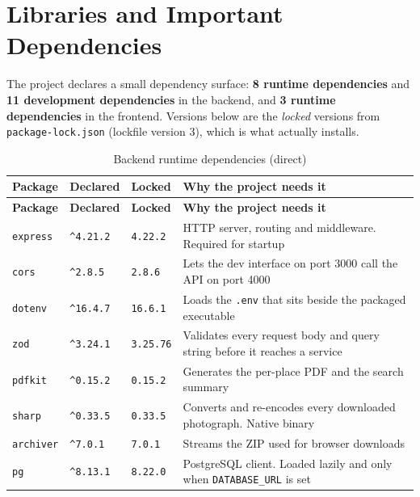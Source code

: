 \documentclass[11pt,a4paper]{report}
\newcommand{\code}[1]{\texttt{\small #1}}
\DeclareRobustCommand{\file}[1]{{\small\nolinkurl{#1}}}
\newcommand{\ver}[1]{\texttt{#1}}
\begin{document}
\chapter{Libraries and Important Dependencies}
\label{sec:libs}

The project declares a small dependency surface: \textbf{8 runtime dependencies}
and \textbf{11 development dependencies} in the backend, and \textbf{3 runtime
dependencies} in the frontend. Versions below are the \emph{locked} versions from
\file{package-lock.json} (lockfile version 3), which is what actually installs.

\begin{longtable}{@{}>{\raggedright\arraybackslash}p{2.9cm}>{\raggedright\arraybackslash}p{1.6cm}>{\raggedright\arraybackslash}p{2.0cm}>{\raggedright\arraybackslash}p{7.6cm}@{}}
\caption{Backend runtime dependencies (direct)}\label{tab:deps-backend}\\
\toprule
\textbf{Package} & \textbf{Declared} & \textbf{Locked} & \textbf{Why the project needs it}\\
\midrule
\endfirsthead
\toprule
\textbf{Package} & \textbf{Declared} & \textbf{Locked} & \textbf{Why the project needs it}\\
\midrule
\endhead
\bottomrule
\endfoot
\code{express}  & \code{\^{}4.21.2} & \ver{4.22.2} & HTTP server, routing and middleware. Required for startup\\
\code{cors}     & \code{\^{}2.8.5}  & \ver{2.8.6}  & Lets the dev interface on port 3000 call the API on port 4000\\
\code{dotenv}   & \code{\^{}16.4.7} & \ver{16.6.1} & Loads the \file{.env} that sits beside the packaged executable\\
\code{zod}      & \code{\^{}3.24.1} & \ver{3.25.76}& Validates every request body and query string before it reaches a service\\
\code{pdfkit}   & \code{\^{}0.15.2} & \ver{0.15.2} & Generates the per-place PDF and the search summary\\
\code{sharp}    & \code{\^{}0.33.5} & \ver{0.33.5} & Converts and re-encodes every downloaded photograph. Native binary\\
\code{archiver} & \code{\^{}7.0.1}  & \ver{7.0.1}  & Streams the ZIP used for browser downloads\\
\code{pg}       & \code{\^{}8.13.1} & \ver{8.22.0} & PostgreSQL client. Loaded lazily and only when \code{DATABASE\_URL} is set\\
\end{longtable}
\end{document}
